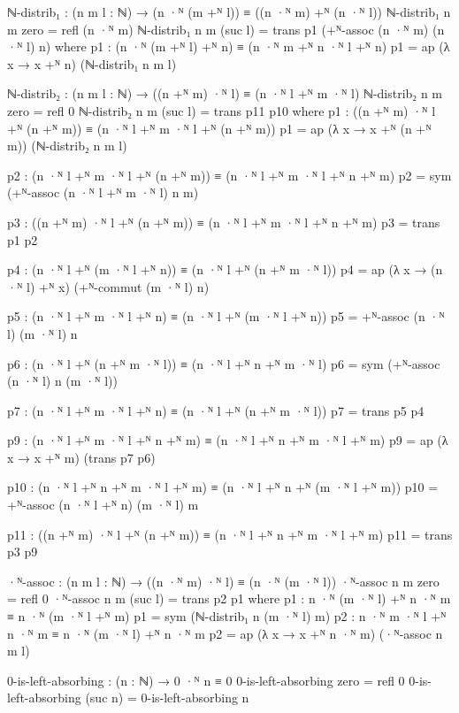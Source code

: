 \documentclass{article}[12pt]
\begin{document}
\begin{code}
ℕ-distrib₁ : (n m l : ℕ) → (n ·ᴺ (m +ᴺ l)) ≡ ((n ·ᴺ m) +ᴺ (n ·ᴺ l))
ℕ-distrib₁ n m zero = refl (n ·ᴺ m)
ℕ-distrib₁ n m (suc l) = trans p1 (+ᴺ-assoc (n ·ᴺ m) (n ·ᴺ l) n)
    where
        p1 : (n ·ᴺ (m +ᴺ l) +ᴺ n) ≡ (n ·ᴺ m +ᴺ n ·ᴺ l +ᴺ n)
        p1 = ap (λ x → x +ᴺ n) (ℕ-distrib₁ n m l)

ℕ-distrib₂ : (n m l : ℕ) → ((n +ᴺ m) ·ᴺ l) ≡ (n ·ᴺ l +ᴺ m ·ᴺ l)
ℕ-distrib₂ n m zero = refl 0
ℕ-distrib₂ n m (suc l) = trans p11 p10
    where
        p1 : ((n +ᴺ m) ·ᴺ l +ᴺ (n +ᴺ m)) ≡ (n ·ᴺ l +ᴺ m ·ᴺ l +ᴺ (n +ᴺ m))
        p1 = ap (λ x → x +ᴺ (n +ᴺ m)) (ℕ-distrib₂ n m l)

        p2 : (n ·ᴺ l +ᴺ m ·ᴺ l +ᴺ (n +ᴺ m)) ≡ (n ·ᴺ l +ᴺ m ·ᴺ l +ᴺ n +ᴺ m)
        p2 = sym (+ᴺ-assoc (n ·ᴺ l +ᴺ m ·ᴺ l) n m)

        p3 : ((n +ᴺ m) ·ᴺ l +ᴺ (n +ᴺ m)) ≡ (n ·ᴺ l +ᴺ m ·ᴺ l +ᴺ n +ᴺ m)
        p3 = trans p1 p2

        p4 : (n ·ᴺ l +ᴺ (m ·ᴺ l +ᴺ n)) ≡ (n ·ᴺ l +ᴺ (n +ᴺ m ·ᴺ l))
        p4 = ap (λ x → (n ·ᴺ l) +ᴺ x) (+ᴺ-commut (m ·ᴺ l) n)

        p5 : (n ·ᴺ l +ᴺ m ·ᴺ l +ᴺ n) ≡ (n ·ᴺ l +ᴺ (m ·ᴺ l +ᴺ n))
        p5 = +ᴺ-assoc (n ·ᴺ l) (m ·ᴺ l) n
        
        p6 : (n ·ᴺ l +ᴺ (n +ᴺ m ·ᴺ l)) ≡ (n ·ᴺ l +ᴺ n +ᴺ m ·ᴺ l)
        p6 = sym (+ᴺ-assoc (n ·ᴺ l) n  (m ·ᴺ l))

        p7 : (n ·ᴺ l +ᴺ m ·ᴺ l +ᴺ n) ≡ (n ·ᴺ l +ᴺ (n +ᴺ m ·ᴺ l))
        p7 = trans p5 p4
        
        p9 : (n ·ᴺ l +ᴺ m ·ᴺ l +ᴺ n +ᴺ m) ≡ (n ·ᴺ l +ᴺ n +ᴺ m ·ᴺ l +ᴺ m)
        p9 = ap (λ x → x +ᴺ m) (trans p7 p6)

        p10 : (n ·ᴺ l +ᴺ n +ᴺ m ·ᴺ l +ᴺ m) ≡ (n ·ᴺ l +ᴺ n +ᴺ (m ·ᴺ l +ᴺ m))
        p10 = +ᴺ-assoc (n ·ᴺ l +ᴺ n) (m ·ᴺ l) m

        p11 : ((n +ᴺ m) ·ᴺ l +ᴺ (n +ᴺ m)) ≡ (n ·ᴺ l +ᴺ n +ᴺ m ·ᴺ l +ᴺ m)
        p11 = trans p3 p9

·ᴺ-assoc : (n m l : ℕ) → ((n ·ᴺ m) ·ᴺ l) ≡ (n ·ᴺ (m ·ᴺ l))
·ᴺ-assoc n m zero = refl 0
·ᴺ-assoc n m (suc l) = trans p2 p1
    where
        p1 : n ·ᴺ (m ·ᴺ l) +ᴺ n ·ᴺ m ≡ n ·ᴺ (m ·ᴺ l +ᴺ m)
        p1 = sym (ℕ-distrib₁ n  (m ·ᴺ l) m)
        p2 : n ·ᴺ m ·ᴺ l +ᴺ n ·ᴺ m ≡ n ·ᴺ (m ·ᴺ l) +ᴺ n ·ᴺ m
        p2 = ap (λ x → x +ᴺ n ·ᴺ m) (·ᴺ-assoc n m l)

0-is-left-absorbing : (n : ℕ) → 0 ·ᴺ n ≡ 0
0-is-left-absorbing zero = refl 0
0-is-left-absorbing (suc n) = 0-is-left-absorbing n


\end{code}
\end{document}
